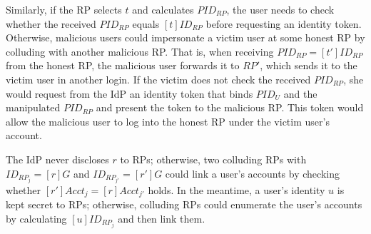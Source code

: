 
Similarly, if the RP selects $t$ and calculates $PID_{RP}$, the user needs to check whether the received $PID_{RP}$ equals $[t]ID_{RP}$ before requesting an identity token.
Otherwise, malicious users could impersonate a victim user at some honest RP by colluding with another malicious RP.
That is, when receiving $PID_{RP}=[t']ID_{RP}$ from the honest RP, the malicious user forwards it to $RP'$, which sends it to the victim user in another login.
If the victim does not check the received $PID_{RP}$, she would request from the IdP an identity token that binds $PID_U$ and the manipulated $PID_{RP}$ and present the token to the malicious RP.
This token would allow the malicious user to log into the honest RP under the victim user's account.

\oldc
The IdP never discloses $r$ to RPs; otherwise, two colluding RPs with $ID_{RP_j} = [r]G$ and $ID_{RP_{j'}} = [r']G$ could link a user's accounts by checking whether $[r']Acct_j = [r]Acct_{j'}$ holds.
\newc
In the meantime, a user's identity $u$ is kept secret to RPs; otherwise, colluding RPs could enumerate the user's accounts by calculating $[u]ID_{RP_j}$ and then link them.
\oldc



